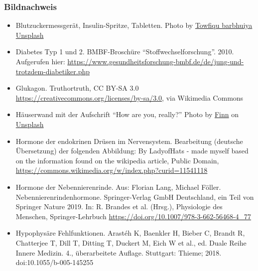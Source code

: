 \documentclass{beamer}
\begin{document}
\begin{frame}
\frametitle{Bildnachweis}

\begin{tiny}
 
\begin{itemize}

\item
Blutzuckermessgerät, Insulin-Spritze, Tabletten. Photo by \href{https://unsplash.com/@towfiqu999999?utm_source=unsplash&utm_medium=referral&utm_content=creditCopyText}{Towfiqu barbhuiya} \href{https://unsplash.com/s/photos/insulin?utm_source=unsplash&utm_medium=referral&utm_content=creditCopyText}{Unsplash}
  
\item
Diabetes Typ 1 und 2. BMBF-Broschüre ``Stoffwechselforschung''. 2010. Aufgerufen hier: \url{https://www.gesundheitsforschung-bmbf.de/de/jung-und-trotzdem-diabetiker.php}

\item
Glukagon. Truthortruth, CC BY-SA 3.0 \url{https://creativecommons.org/licenses/by-sa/3.0}, via Wikimedia Commons

\item
Häuserwand mit der Aufschrift ``How are you, really?'' Photo by \href{https://unsplash.com/@finnnyc?utm_source=unsplash&utm_medium=referral&utm_content=creditCopyText}{Finn} on \href{https://unsplash.com/s/photos/hormones?utm_source=unsplash&utm_medium=referral&utm_content=creditCopyText}{Unsplash}
  

\item
Hormone der endokrinen Drüsen im Nervensystem. Bearbeitung (deutsche Übersetzung) der folgenden Abbildung: By LadyofHats - made myself based on the information found on the wikipedia article, Public Domain, \url{https://commons.wikimedia.org/w/index.php?curid=11541118}

\item
Hormone der Nebennierenrinde. Aus: Florian Lang, Michael Föller. Nebennierenrindenhormone. Springer-Verlag GmbH Deutschland, ein Teil von Springer Nature 2019. In: R. Brandes et al. (Hrsg.), Physiologie des Menschen, Springer-Lehrbuch \url{https://doi.org/10.1007/978-3-662-56468-4_77}


\item
Hypophysäre Fehlfunktionen. Arastéh K, Baenkler H, Bieber C, Brandt R, Chatterjee T, Dill T, Ditting T, Duckert M, Eich W et al., ed.  Duale Reihe Innere Medizin. 4., überarbeitete Auflage. Stuttgart: Thieme; 2018. doi:10.1055/b-005-145255


\end{itemize}
\end{tiny}
\end{frame}
\end{document}
